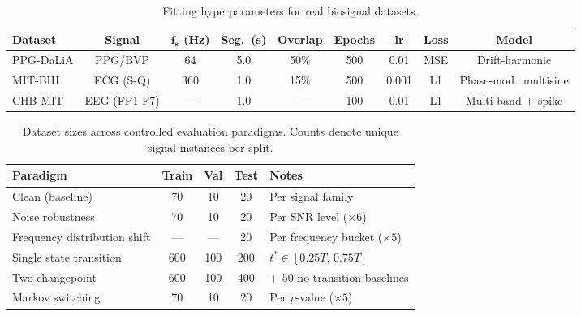 \documentclass[11pt]{article}
\begin{document}
\begin{table}[ht]
\centering
\caption{Fitting hyperparameters for real biosignal datasets.}
\label{tab:fitting}
\smallskip
\begin{tabular}{@{}lcccccccc@{}}
\toprule
\textbf{Dataset} & \textbf{Signal} & $\boldsymbol{f_s}$ \textbf{(Hz)} & \textbf{Seg.\ (s)} & \textbf{Overlap} & \textbf{Epochs} & \textbf{lr} & \textbf{Loss} & \textbf{Model} \\
\midrule
PPG-DaLiA & PPG/BVP     & 64  & 5.0 & 50\% & 500 & 0.01  & MSE & Drift-harmonic         \\
MIT-BIH   & ECG (S-Q)   & 360 & 1.0 & 15\% & 500 & 0.001 & L1  & Phase-mod.\ multisine  \\
CHB-MIT   & EEG (FP1-F7)& --- & 1.0 & ---  & 100 & 0.01  & L1  & Multi-band + spike     \\
\bottomrule
\end{tabular}
\end{table}

\begin{table}[ht]
\centering
\caption{Dataset sizes across controlled evaluation paradigms. Counts denote unique signal instances per split.}
\label{tab:dataset_sizes}
\smallskip
\begin{tabular}{@{}lcccl@{}}
\toprule
\textbf{Paradigm} & \textbf{Train} & \textbf{Val} & \textbf{Test} & \textbf{Notes} \\
\midrule
Clean (baseline)            & 70  & 10  & 20  & Per signal family \\
Noise robustness            & 70  & 10  & 20  & Per SNR level ($\times 6$) \\
Frequency distribution shift& --- & --- & 20  & Per frequency bucket ($\times 5$) \\
Single state transition     & 600 & 100 & 200 & $t^* \in [0.25T,\, 0.75T]$ \\
Two-changepoint             & 600 & 100 & 400 & + 50 no-transition baselines \\
Markov switching            & 70  & 10  & 20  & Per $p$-value ($\times 5$) \\
\bottomrule
\end{tabular}
\end{table}
\end{document}
